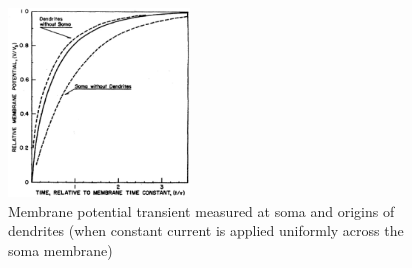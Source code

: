 \begin{figure}[hbt]
  \centerline{\includegraphics[height=5cm,
    angle=0]{./images/potential_soma.eps}}
  \caption{Membrane potential transient measured at soma and origins
    of dendrites (when constant current is applied uniformly across
    the soma membrane)}
\label{fig:soma_potential}
\end{figure}

